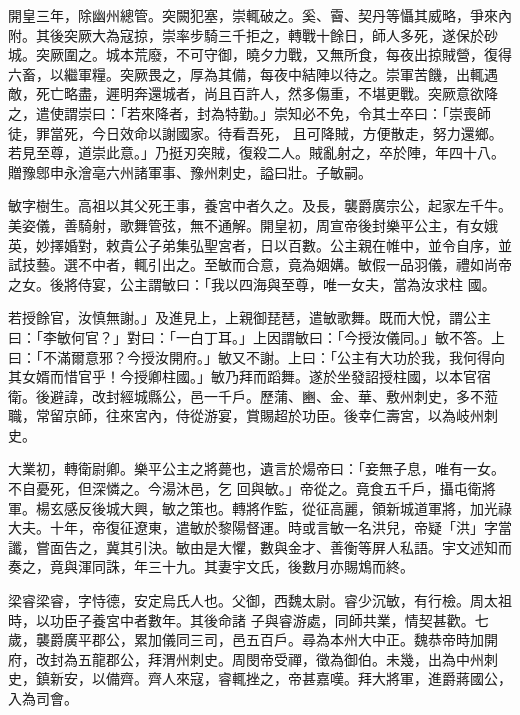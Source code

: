 \begin{pinyinscope}
 開皇三年，除幽州總管。突闕犯塞，崇輒破之。奚、霫、契丹等懾其威略，爭來內附。其後突厥大為寇掠，崇率步騎三千拒之，轉戰十餘日，師人多死，遂保於砂城。突厥圍之。城本荒廢，不可守御，曉夕力戰，又無所食，每夜出掠賊營，復得六畜，以繼軍糧。突厥畏之，厚為其備，每夜中結陣以待之。崇軍苦饑，出輒遇敵，死亡略盡，遲明奔還城者，尚且百許人，然多傷重，不堪更戰。突厥意欲降之，遣使謂崇曰：「若來降者，封為特勤。」崇知必不免，令其士卒曰：「崇喪師徒，罪當死，今日效命以謝國家。待看吾死，
 且可降賊，方便散走，努力還鄉。若見至尊，道崇此意。」乃挺刃突賊，復殺二人。賊亂射之，卒於陣，年四十八。贈豫鄎申永澮亳六州諸軍事、豫州刺史，謚曰壯。子敏嗣。



 敏字樹生。高祖以其父死王事，養宮中者久之。及長，襲爵廣宗公，起家左千牛。美姿儀，善騎射，歌舞管弦，無不通解。開皇初，周宣帝後封樂平公主，有女娥英，妙擇婚對，敕貴公子弟集弘聖宮者，日以百數。公主親在帷中，並令自序，並試技藝。選不中者，輒引出之。至敏而合意，竟為姻媾。敏假一品羽儀，禮如尚帝之女。後將侍宴，公主謂敏曰：「我以四海與至尊，唯一女夫，當為汝求柱
 國。



 若授餘官，汝慎無謝。」及進見上，上親御琵琶，遣敏歌舞。既而大悅，謂公主曰：「李敏何官？」對曰：「一白丁耳。」上因謂敏曰：「今授汝儀同。」敏不答。上曰：「不滿爾意邪？今授汝開府。」敏又不謝。上曰：「公主有大功於我，我何得向其女婿而惜官乎！今授卿柱國。」敏乃拜而蹈舞。遂於坐發詔授柱國，以本官宿衛。後避諱，改封經城縣公，邑一千戶。歷蒲、豳、金、華、敷州刺史，多不蒞職，常留京師，往來宮內，侍從游宴，賞賜超於功臣。後幸仁壽宮，以為岐州刺史。



 大業初，轉衛尉卿。樂平公主之將薨也，遺言於煬帝曰：「妾無子息，唯有一女。不自憂死，但深憐之。今湯沐邑，乞
 回與敏。」帝從之。竟食五千戶，攝屯衛將軍。楊玄感反後城大興，敏之策也。轉將作監，從征高麗，領新城道軍將，加光祿大夫。十年，帝復征遼東，遣敏於黎陽督運。時或言敏一名洪兒，帝疑「洪」字當讖，嘗面告之，冀其引決。敏由是大懼，數與金才、善衡等屏人私語。宇文述知而奏之，竟與渾同誅，年三十九。其妻宇文氏，後數月亦賜鴆而終。



 梁睿梁睿，字恃德，安定烏氏人也。父御，西魏太尉。睿少沉敏，有行檢。周太祖時，以功臣子養宮中者數年。其後命諸
 子與睿游處，同師共業，情契甚歡。七歲，襲爵廣平郡公，累加儀同三司，邑五百戶。尋為本州大中正。魏恭帝時加開府，改封為五龍郡公，拜渭州刺史。周閔帝受禪，徵為御伯。未幾，出為中州刺史，鎮新安，以備齊。齊人來寇，睿輒挫之，帝甚嘉嘆。拜大將軍，進爵蔣國公，入為司會。




\end{pinyinscope}
